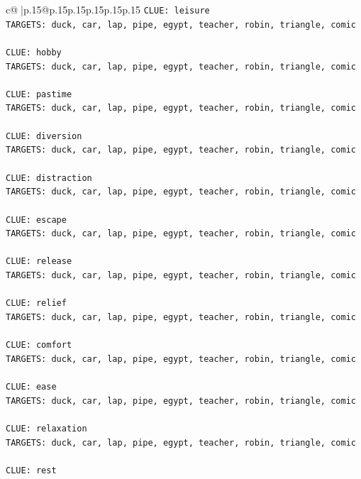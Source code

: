 \documentclass{article}
\begin{document}
{\begin{supertabular}{c@{$\;$}|p{.15\linewidth}@{}p{.15\linewidth}p{.15\linewidth}p{.15\linewidth}p{.15\linewidth}p{.15\linewidth}}
{{{\texttt{CLUE: leisure} \\
\texttt{TARGETS: duck, car, lap, pipe, egypt, teacher, robin, triangle, comic} \\
\\ 
\texttt{CLUE: hobby} \\
\texttt{TARGETS: duck, car, lap, pipe, egypt, teacher, robin, triangle, comic} \\
\\ 
\texttt{CLUE: pastime} \\
\texttt{TARGETS: duck, car, lap, pipe, egypt, teacher, robin, triangle, comic} \\
\\ 
\texttt{CLUE: diversion} \\
\texttt{TARGETS: duck, car, lap, pipe, egypt, teacher, robin, triangle, comic} \\
\\ 
\texttt{CLUE: distraction} \\
\texttt{TARGETS: duck, car, lap, pipe, egypt, teacher, robin, triangle, comic} \\
\\ 
\texttt{CLUE: escape} \\
\texttt{TARGETS: duck, car, lap, pipe, egypt, teacher, robin, triangle, comic} \\
\\ 
\texttt{CLUE: release} \\
\texttt{TARGETS: duck, car, lap, pipe, egypt, teacher, robin, triangle, comic} \\
\\ 
\texttt{CLUE: relief} \\
\texttt{TARGETS: duck, car, lap, pipe, egypt, teacher, robin, triangle, comic} \\
\\ 
\texttt{CLUE: comfort} \\
\texttt{TARGETS: duck, car, lap, pipe, egypt, teacher, robin, triangle, comic} \\
\\ 
\texttt{CLUE: ease} \\
\texttt{TARGETS: duck, car, lap, pipe, egypt, teacher, robin, triangle, comic} \\
\\ 
\texttt{CLUE: relaxation} \\
\texttt{TARGETS: duck, car, lap, pipe, egypt, teacher, robin, triangle, comic} \\
\\ 
\texttt{CLUE: rest} \\
}}}
\end{supertabular}}
\end{document}
